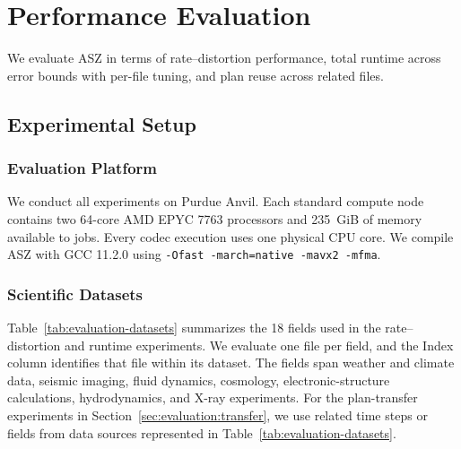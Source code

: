 \section{Performance Evaluation}
\label{sec:evaluation}

We evaluate ASZ in terms of rate--distortion performance, total runtime across error bounds with per-file tuning, and plan reuse across related files.

\subsection{Experimental Setup}
\label{sec:evaluation:setup}

\subsubsection{Evaluation Platform}

We conduct all experiments on Purdue Anvil. Each standard compute node contains two 64-core AMD EPYC 7763 processors and 235~GiB of memory available to jobs. Every codec execution uses one physical CPU core. We compile ASZ with GCC 11.2.0 using \verb|-Ofast -march=native -mavx2 -mfma|.

\subsubsection{Scientific Datasets}

Table~\ref{tab:evaluation-datasets} summarizes the 18 fields used in the rate--distortion and runtime experiments. We evaluate one file per field, and the Index column identifies that file within its dataset. The fields span weather and climate data, seismic imaging, fluid dynamics, cosmology, electronic-structure calculations, hydrodynamics, and X-ray experiments. For the plan-transfer experiments in Section~\ref{sec:evaluation:transfer}, we use related time steps or fields from data sources represented in Table~\ref{tab:evaluation-datasets}.


